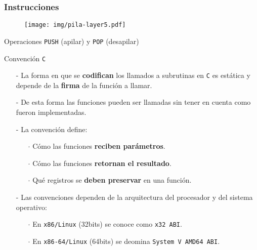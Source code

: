 \documentclass[aspectratio=169]{beamer}
\begin{document}
\begin{frame}
    \frametitle{Instrucciones}
    \begin{center}
    \vspace{-0.7cm}
    \begin{minipage}{1\textwidth}
    \begin{figure}
    \centering
    \texttt{[image: img/pila-layer5.pdf]}
    \end{figure}
    \end{minipage}
    Operaciones \texttt{PUSH} (apilar) y \texttt{POP} (desapilar)
    \end{center}
\end{frame}

\begin{frame}{Convención \texttt{C}}
    \begin{itemize}
    \item[-] La forma en que se \textbf{codifican} los llamados a subrutinas en \texttt{C} es estática y depende de la \textbf{firma} de la función a llamar.
    \vspace{0.5cm}
    \pause
    \item[-] De esta forma las funciones pueden ser llamadas sin tener en cuenta como fueron implementadas.
    \vspace{0.5cm}
    \pause
    \item[-] La convención define:
    \begin{itemize}
    \item[$\cdot$] Cómo las funciones \textbf{reciben parámetros}.
    \pause
    \item[$\cdot$] Cómo las funciones \textbf{retornan el resultado}.
    \pause
    \item[$\cdot$] Qué registros se \textbf{deben preservar} en una función.
    \end{itemize}
    \vspace{0.5cm}
    \pause
    \item[-] Las convenciones dependen de la arquitectura del procesador y del sistema operativo:
    \begin{itemize}
    \item[$\cdot$] En \texttt{x86/Linux} (32bits) se conoce como \texttt{x32 ABI}.
    \item[$\cdot$] En \texttt{x86-64/Linux} (64bits) se deomina \texttt{System V AMD64 ABI}.
    \end{itemize}
    \end{itemize}
\end{frame}
\end{document}

